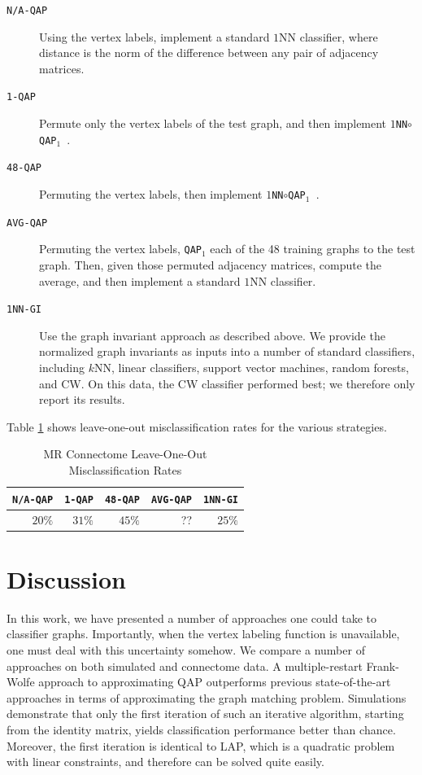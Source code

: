 \documentclass{article} %
\newcommand{\qapa}{\texttt{QAP}$_1$ }
\begin{document}
\begin{description}
	\item[\texttt{N/A-QAP}] Using the vertex labels, implement a standard $1$NN classifier, where distance is the norm of the difference between any pair of adjacency matrices.
	\item[\texttt{1-QAP}] Permute only the vertex labels of the test graph, and then implement \texttt{$1$NN$\circ$\qapa}.
	\item[\texttt{48-QAP}] Permuting the vertex labels, then implement \texttt{$1$NN$\circ$\qapa}.
	\item[\texttt{AVG-QAP}] Permuting the vertex labels, \qapa each of the 48 training graphs to the test graph.  Then, given those permuted adjacency matrices, compute the average, and then implement a standard $1$NN classifier.
	\item[\texttt{1NN-GI}] Use the graph invariant approach as described above. We provide the normalized graph invariants as inputs into a number of standard classifiers, including $k$NN, linear classifiers, support vector machines, random forests, and CW. On this data, the CW classifier performed best; we therefore only report its results.
\end{description}

Table \ref{tab:connectome} shows leave-one-out misclassification rates for the various strategies.


\begin{table}[h!]
\caption{MR Connectome Leave-One-Out Misclassification Rates}
\begin{center}
\begin{tabular}{|r|r|r|r|r|}
\hline
\texttt{N/A-QAP} & \texttt{1-QAP} & \texttt{48-QAP} & \texttt{AVG-QAP} & \texttt{1NN-GI}\\
\hline
$20\%$ & $31\%$ & $45\%$ & ?? & $25\%$ \\
    \hline
\end{tabular}
\end{center}
\label{tab:connectome}
\end{table}%


\section{Discussion}


In this work, we have presented a number of approaches one could take to classifier graphs.  Importantly, when the vertex labeling function is unavailable, one must deal with this uncertainty somehow.  We compare a number of approaches on both simulated and connectome data.  A multiple-restart Frank-Wolfe approach to approximating QAP outperforms previous state-of-the-art approaches in terms of approximating the graph matching problem.  Simulations demonstrate that only the first iteration of such an iterative algorithm, starting from the identity matrix, yields classification performance better than chance.  Moreover, the first iteration is identical to LAP, which is a quadratic problem with linear constraints, and therefore can be solved quite easily.  
\end{document}
